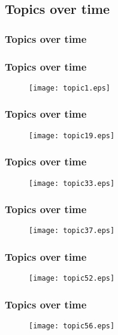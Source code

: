 \documentclass{beamer}
\begin{document}
\subsection{Topics over time}

\begin{frame}
  \frametitle{Topics over time}
\end{frame}

\begin{frame}
  \frametitle{Topics over time}
  \begin{figure}
	\texttt{[image: topic1.eps]}
  \end{figure}
\end{frame}
\begin{frame}
  \frametitle{Topics over time}
  \begin{figure}
	\texttt{[image: topic19.eps]}
  \end{figure}
\end{frame}
\begin{frame}
  \frametitle{Topics over time}
  \begin{figure}
	\texttt{[image: topic33.eps]}
  \end{figure}
\end{frame}
\begin{frame}
  \frametitle{Topics over time}
  \begin{figure}
	\texttt{[image: topic37.eps]}
  \end{figure}
\end{frame}
\begin{frame}
  \frametitle{Topics over time}
  \begin{figure}
	\texttt{[image: topic52.eps]}
  \end{figure}
\end{frame}
\begin{frame}
  \frametitle{Topics over time}
  \begin{figure}
	\texttt{[image: topic56.eps]}
  \end{figure}
\end{frame}
\end{document}
